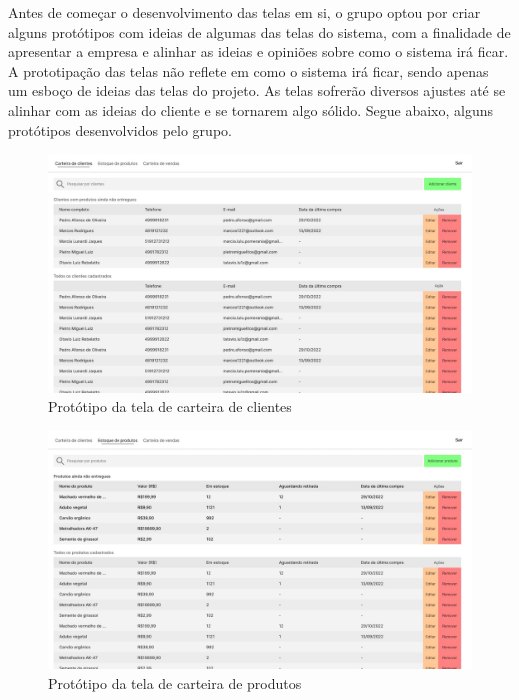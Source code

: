 \documentclass[serif, english, brazilian, oneside]{uffstex}
\begin{document}
Antes de começar o desenvolvimento das telas em si, o grupo optou por criar alguns protótipos com ideias de algumas das telas do sistema, com a finalidade de apresentar a empresa e alinhar as ideias e opiniões sobre como o sistema irá ficar.
A prototipação das telas não reflete em como o sistema irá ficar, sendo apenas um esboço de ideias das telas do projeto. As telas sofrerão diversos ajustes até se alinhar com as ideias do cliente e se tornarem algo sólido.
Segue abaixo, alguns protótipos desenvolvidos pelo grupo.


\begin{figure}[!htpb]
    \centering
    \caption{Protótipo da tela de carteira de clientes}
    \label{fig:prototipo_carteira_clientes}
    \includegraphics[width=\linewidth]{imagens/prototipo_carteira_clientes.jpeg}
\end{figure}

\begin{figure}[!htpb]
    \centering
    \caption{Protótipo da tela de carteira de produtos}
    \label{fig:prototipo_carteira_produtos}
    \includegraphics[width=\linewidth]{imagens/prototipo_estoque_produtos.jpeg}
\end{figure}
\end{document}
